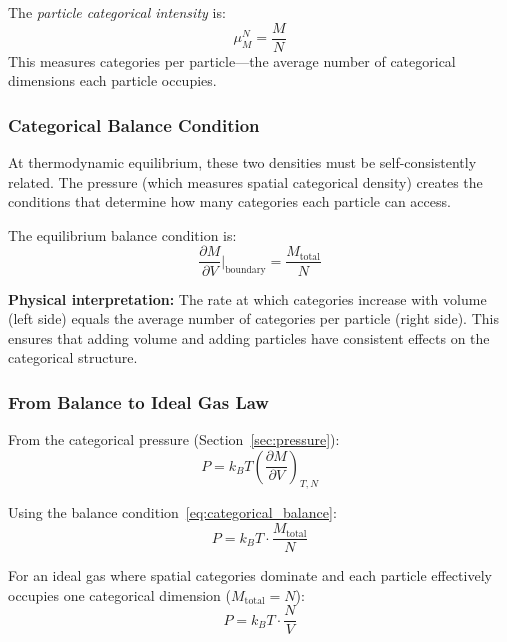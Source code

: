 \begin{definition}
The \textit{particle categorical intensity} is:
\begin{equation}
\mu_M^N = \frac{M}{N}
\end{equation}
This measures categories per particle—the average number of categorical dimensions each particle occupies.
\end{definition}

\subsubsection{Categorical Balance Condition}

At thermodynamic equilibrium, these two densities must be self-consistently related. The pressure (which measures spatial categorical density) creates the conditions that determine how many categories each particle can access.

The equilibrium balance condition is:
\begin{equation}
\frac{\partial M}{\partial V}\bigg|_{\text{boundary}} = \frac{M_{\text{total}}}{N}
\label{eq:categorical_balance}
\end{equation}

\textbf{Physical interpretation:} The rate at which categories increase with volume (left side) equals the average number of categories per particle (right side). This ensures that adding volume and adding particles have consistent effects on the categorical structure.

\subsubsection{From Balance to Ideal Gas Law}

From the categorical pressure (Section~\ref{sec:pressure}):
\begin{equation}
P = k_B T \left(\frac{\partial M}{\partial V}\right)_{T,N}
\end{equation}

Using the balance condition~\eqref{eq:categorical_balance}:
\begin{equation}
P = k_B T \cdot \frac{M_{\text{total}}}{N}
\end{equation}

For an ideal gas where spatial categories dominate and each particle effectively occupies one categorical dimension ($M_{\text{total}} = N$):
\begin{equation}
P = k_B T \cdot \frac{N}{V}
\end{equation}

